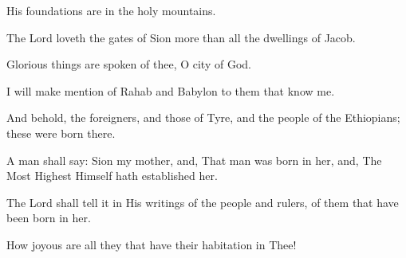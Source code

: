 His foundations are in the holy mountains.

The Lord loveth the gates of Sion more than all the dwellings of Jacob.

Glorious things are spoken of thee, O city of God.

I will make mention of Rahab and Babylon to them that know me.

And behold, the foreigners, and those of Tyre, and the people of the Ethiopians; these were born there.

A man shall say: Sion my mother, and, That man was born in her, and, The Most Highest Himself hath established her.

The Lord shall tell it in His writings of the people and rulers, of them that have been born in her.

How joyous are all they that have their habitation in Thee!

